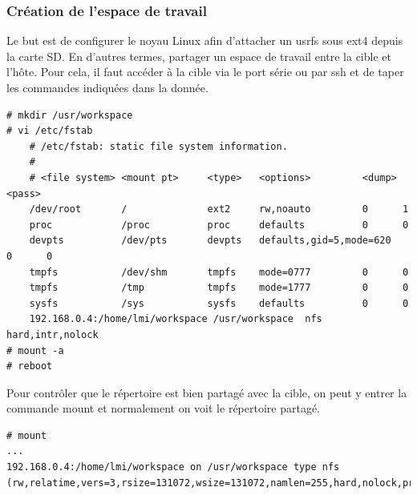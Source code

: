 \subsubsection{Création de l'espace de travail}
Le but est de configurer le noyau Linux afin d’attacher un usrfs sous ext4 depuis la carte SD. En d’autres termes, partager un espace de travail entre la cible et l’hôte. Pour cela, il faut accéder à la cible via le port série ou par ssh et de taper les commandes indiquées dans la donnée.
\begin{lstlisting}
# mkdir /usr/workspace
# vi /etc/fstab
	# /etc/fstab: static file system information.
	#
	# <file system> <mount pt>     <type>   <options>         <dump> <pass>
	/dev/root       /              ext2     rw,noauto         0      1
	proc            /proc          proc     defaults          0      0
	devpts          /dev/pts       devpts   defaults,gid=5,mode=620   0      0
	tmpfs           /dev/shm       tmpfs    mode=0777         0      0
	tmpfs           /tmp           tmpfs    mode=1777         0      0
	sysfs           /sys           sysfs    defaults          0      0
	192.168.0.4:/home/lmi/workspace /usr/workspace  nfs     hard,intr,nolock
# mount -a
# reboot
\end{lstlisting}
Pour contrôler que le répertoire est bien partagé avec la cible, on peut y entrer la commande mount et normalement on voit le répertoire partagé.
\begin{lstlisting}
# mount
...
192.168.0.4:/home/lmi/workspace on /usr/workspace type nfs (rw,relatime,vers=3,rsize=131072,wsize=131072,namlen=255,hard,nolock,proto=tcp,timeo=600,retrans=2,sec=sys,mountaddr=192.168.0.4,mountvers=3,mountproto=tcp,local_lock=all,addr=192.168.0.4)
\end{lstlisting}
